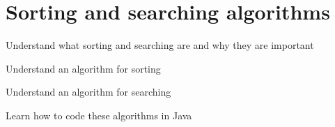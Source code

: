 \chapter{Sorting and searching algorithms}

\begin{goals}
\item Understand what sorting and searching are and why they are important
\item Understand an algorithm for sorting
\item Understand an algorithm for searching
\item Learn how to code these algorithms in Java
\end{goals}

 




